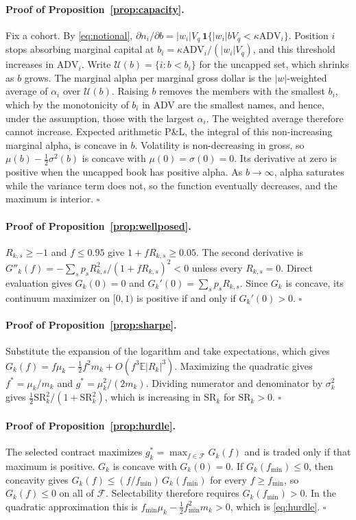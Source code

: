 \documentclass[11pt]{article}
\theoremstyle{definition}
\newcommand{\E}{\mathbb{E}}
\newcommand{\1}{\mathbf{1}}
\newcommand{\F}{\mathcal{F}}
\begin{document}
\paragraph{Proof of Proposition~\ref{prop:capacity}.}
Fix a cohort. By \eqref{eq:notional}, $\partial n_i/\partial b=|w_i|V_q\,\1\{|w_i|bV_q<\kappa\mathrm{ADV}_i\}$.
Position $i$ stops absorbing marginal capital at $b_i=\kappa\mathrm{ADV}_i/(|w_i|V_q)$, and
this threshold increases in $\mathrm{ADV}_i$. Write
$\mathcal{U}(b)=\{i: b<b_i\}$ for the uncapped set, which shrinks as $b$ grows. The marginal
alpha per marginal gross dollar is the $|w|$-weighted average of $\alpha_i$ over
$\mathcal{U}(b)$. Raising $b$ removes the members with the smallest $b_i$, which by the
monotonicity of $b_i$ in ADV are the smallest names, and hence, under the assumption, those
with the largest $\alpha_i$. The weighted average therefore cannot increase. Expected
arithmetic P\&L, the integral of this non-increasing marginal alpha, is concave in $b$.
Volatility is non-decreasing in gross, so
$\mu(b)-\tfrac12\sigma^2(b)$ is concave with $\mu(0)=\sigma(0)=0$. Its derivative at zero is
positive when the uncapped book has positive alpha. As $b\to\infty$, alpha saturates while
the variance term does not, so the function eventually decreases, and the maximum is
interior. $\square$

\paragraph{Proof of Proposition~\ref{prop:wellposed}.}
$R_{k,s}\ge-1$ and $f\le0.95$ give $1+fR_{k,s}\ge0.05$. The second derivative is
$G''_k(f)=-\sum_sp_sR_{k,s}^2/(1+fR_{k,s})^2<0$ unless every $R_{k,s}=0$. Direct evaluation
gives $G_k(0)=0$ and $G_k'(0)=\sum_sp_sR_{k,s}$. Since $G_k$ is concave, its continuum
maximizer on $[0,1)$ is positive if and only if $G_k'(0)>0$. $\square$

\paragraph{Proof of Proposition~\ref{prop:sharpe}.}
Substitute the expansion of the logarithm and take expectations, which gives
$G_k(f)=f\mu_k-\tfrac12f^2m_k+O(f^3\E|R_k|^3)$. Maximizing the quadratic gives
$f^\ast=\mu_k/m_k$ and $g^\ast=\mu_k^2/(2m_k)$. Dividing numerator and denominator by
$\sigma_k^2$ gives $\tfrac12\mathrm{SR}_k^2/(1+\mathrm{SR}_k^2)$, which is increasing in
$\mathrm{SR}_k$ for $\mathrm{SR}_k>0$. $\square$

\paragraph{Proof of Proposition~\ref{prop:hurdle}.}
The selected contract maximizes $g^\ast_k=\max_{f\in\F}G_k(f)$ and is traded only if that
maximum is positive. $G_k$ is concave with $G_k(0)=0$. If $G_k(f_{\min})\le0$, then
concavity gives $G_k(f)\le (f/f_{\min})\,G_k(f_{\min})$ for every $f\ge f_{\min}$, so
$G_k(f)\le 0$ on all of $\F$. Selectability therefore requires $G_k(f_{\min})>0$. In the
quadratic approximation this is $f_{\min}\mu_k-\tfrac12f_{\min}^2m_k>0$, which is
\eqref{eq:hurdle}. $\square$
\end{document}
